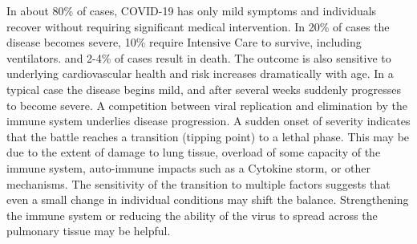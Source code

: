 \documentclass[onecolumn,journal]{IEEEtran}
\begin{document}
\begin{multicols}{2}



In about 80\% of cases, COVID-19 has only mild symptoms and individuals recover without requiring significant medical intervention. In 20\% of cases the disease becomes severe, 10\% require Intensive Care to survive, including ventilators. and 2-4\% of cases result in death. The outcome is also sensitive to underlying cardiovascular health and risk increases dramatically with age. In a typical case the disease begins mild, and after several weeks suddenly progresses to become severe. A competition between viral replication and elimination by the immune system underlies disease progression. A sudden onset of severity indicates that the battle reaches a transition (tipping point) to a lethal phase. This may be due to the extent of damage to lung tissue, overload of some capacity of the immune system,  auto-immune impacts such as a Cytokine storm, or other mechanisms. The sensitivity of the transition to multiple factors suggests that even a small change in individual conditions may shift the balance. Strengthening the immune system or reducing the ability of the virus to spread across the pulmonary tissue may be helpful.



\end{multicols}
\end{document}
